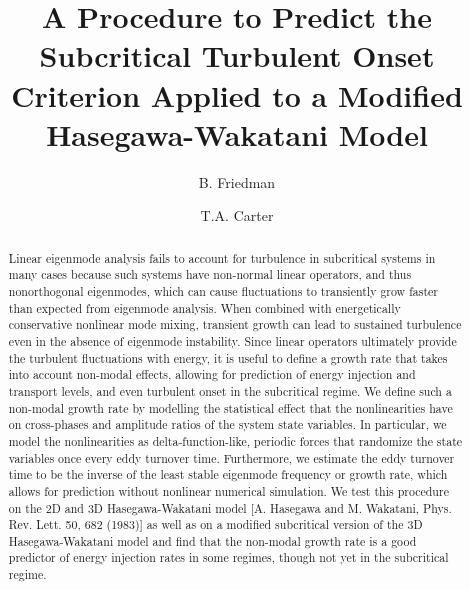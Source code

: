 \documentclass[twocolumn,showkeys,superscriptaddress]{revtex4}
\begin{document}
\title{A Procedure to Predict the Subcritical Turbulent Onset Criterion Applied to a Modified Hasegawa-Wakatani Model}

\author{B. Friedman}



\author{T.A. Carter}




\begin{abstract}
Linear eigenmode analysis fails to account for turbulence in subcritical systems in many cases because such systems have non-normal linear operators, and thus
nonorthogonal eigenmodes, which can cause fluctuations to transiently grow faster than expected from eigenmode analysis. When combined with energetically conservative nonlinear mode mixing, 
transient growth can lead to sustained turbulence even in the absence of eigenmode instability. 
Since linear operators ultimately provide the turbulent fluctuations with energy, it is useful to define a growth rate that takes into account non-modal effects, allowing for
prediction of energy injection and transport levels, and even turbulent onset in the subcritical regime. 
We define such a non-modal growth rate by modelling the statistical effect that the nonlinearities have on cross-phases and amplitude ratios of the system state variables. 
In particular, we model the nonlinearities as delta-function-like, periodic forces that randomize the state variables once every eddy turnover time. Furthermore, we estimate the eddy turnover
time to be the inverse of the least stable eigenmode frequency or growth rate, which allows for prediction without nonlinear numerical simulation. We test this procedure on the 2D and 3D Hasegawa-Wakatani model
[A. Hasegawa and M. Wakatani, Phys. Rev. Lett. 50, 682 (1983)] as well as on a modified subcritical version of the 3D Hasegawa-Wakatani model and find that
the non-modal growth rate is a good predictor of energy injection rates in some regimes, though not yet in the subcritical regime.
\end{abstract}

\maketitle
\end{document}
